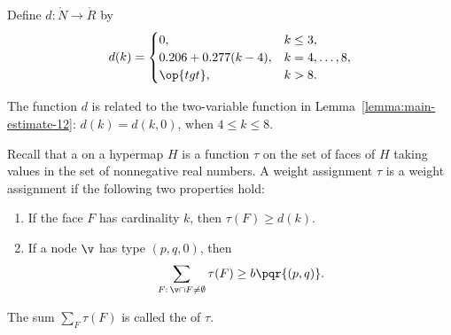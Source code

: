 \begin{definition}[d]
Define $d:\ring{N}\to \ring{R}$ by
\[d(k) = \begin{cases}
0, & k\le 3, \\
0.206 + 0.277 (k-4),& k=4,\ldots,8,\\
\op{tgt},& k>8.\\
\end{cases}
\]
\end{definition}
%

The function $d$ is related to the two-variable function in
Lemma~\ref{lemma:main-estimate-12}: $d(k) = d(k,0)$, when $4\le k\le
8$.

\begin{definition}
%
  Recall that a  on a hypermap $H$ is a
  function $\tau$ on the set of faces of $H$ taking values in the set
  of nonnegative real numbers. A weight assignment $\tau$
is a 
  weight assignment if the following two properties hold:
%
\begin{enumerate}
\item If the face $F$ has cardinality $k$, then
$\tau(F) \ge d(k)$.
\item If a node $\v$ has type $(p,q,0)$, then
  \[\sum_{F:\,\v\cap F\ne\emptyset} \tau(F) \ge
    b{\pqr{(p,q)}}.\]
\end{enumerate}
The sum $\sum_F \tau(F)$ is called the  of $\tau$.
%
\end{definition}


